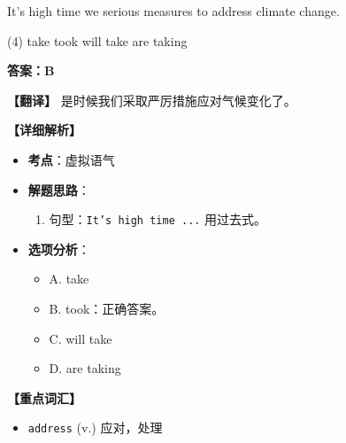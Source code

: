 \documentclass[11pt, a4paper]{article}
\newcommand{\analysis}[4]{
    \begin{solutionbox}
        \textbf{答案：#1}
        
        \textbf{【翻译】} #2
        
        \textbf{【详细解析】}
        #3
        
        \textbf{【重点词汇】}
        #4
    \end{solutionbox}
}
\newcommand{\blank}{\underline{\hspace{1.5cm}}}
\begin{document}
\begin{questions}
    \item It's high time we \blank serious measures to address climate change.
    \begin{tasks}(4)
        \task take \task took \task will take \task are taking
    \end{tasks}
    \analysis{B}{是时候我们采取严厉措施应对气候变化了。}{
        \begin{itemize}
            \item \textbf{考点}：虚拟语气
            \item \textbf{解题思路}：
                \begin{enumerate}
                    \item 句型：\texttt{It's high time ...} 用过去式。
                \end{enumerate}
            \item \textbf{选项分析}：
                \begin{itemize}
                    \item A. take
                    \item B. took：正确答案。
                    \item C. will take
                    \item D. are taking
                \end{itemize}
        \end{itemize}
    }{
        \begin{itemize}
            \item \texttt{address} (v.) 应对，处理
        \end{itemize}
    }


\end{questions}
\end{document}
